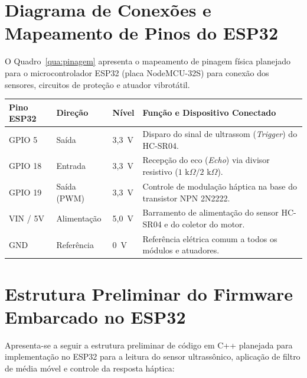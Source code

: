 \chapter{Diagrama de Conexões e Mapeamento de Pinos do ESP32}
\label{anexo-pinagem}

O Quadro~\ref{qua:pinagem} apresenta o mapeamento de pinagem física planejado para o microcontrolador ESP32 (placa NodeMCU-32S) para conexão dos sensores, circuitos de proteção e atuador vibrotátil.

\begin{quadro}[htb]
\centering
\caption{Mapeamento dos pinos de entrada e saída (GPIO) previsto para o protótipo}
\label{qua:pinagem}
\small
\begin{tabular}{|l|l|l|p{7.5cm}|}
\hline
\textbf{Pino ESP32} & \textbf{Direção} & \textbf{Nível} & \textbf{Função e Dispositivo Conectado} \\
\hline
GPIO 5 & Saída & 3,3~V & Disparo do sinal de ultrassom (\textit{Trigger}) do HC-SR04. \\
\hline
GPIO 18 & Entrada & 3,3~V & Recepção do eco (\textit{Echo}) via divisor resistivo ($1\text{ k}\Omega / 2\text{ k}\Omega$). \\
\hline
GPIO 19 & Saída (PWM) & 3,3~V & Controle de modulação háptica na base do transistor NPN 2N2222. \\
\hline
VIN / 5V & Alimentação & 5,0~V & Barramento de alimentação do sensor HC-SR04 e do coletor do motor. \\
\hline
GND & Referência & 0~V & Referência elétrica comum a todos os módulos e atuadores. \\
\hline
\end{tabular}
\normalsize
{}
\end{quadro}

\chapter{Estrutura Preliminar do Firmware Embarcado no ESP32}
\label{anexo-firmware}

Apresenta-se a seguir a estrutura preliminar de código em C++ planejada para implementação no ESP32 para a leitura do sensor ultrassônico, aplicação de filtro de média móvel e controle da resposta háptica:

